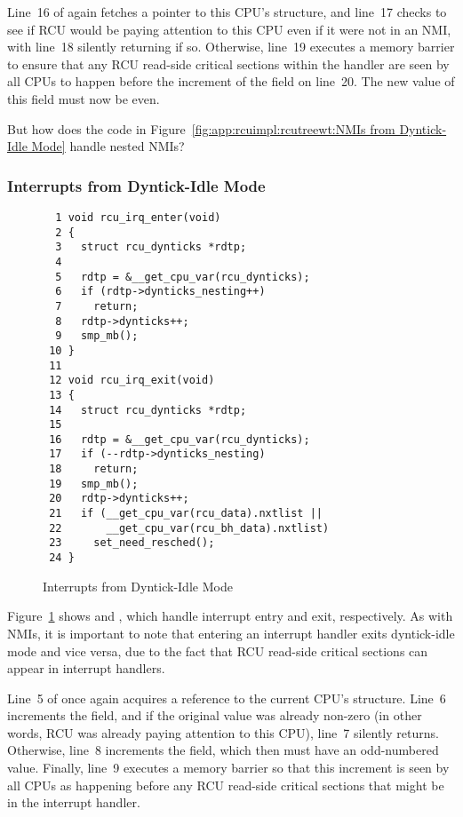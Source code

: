 Line~16 of  again fetches a pointer to this CPU's
 structure, and line~17 checks to see if RCU would
be paying attention to this CPU even if it were not in an NMI,
with line~18 silently returning if so.
Otherwise, line~19 executes a memory barrier to ensure that any
RCU read-side critical sections within the handler are seen by all
CPUs to happen before the increment of the  field
on line~20.
The new value of this field must now be even.

\QuickQuiz{}
	But how does the code in
	Figure~\ref{fig:app:rcuimpl:rcutreewt:NMIs from Dyntick-Idle Mode}
	handle nested NMIs?
 \QuickQuizEnd

\subsubsection{Interrupts from Dyntick-Idle Mode}
\label{app:rcuimpl:rcutreewt:Interrupts from Dyntick-Idle Mode}

\begin{figure}[tbp]
{ \scriptsize
\begin{verbatim}
  1 void rcu_irq_enter(void)
  2 {
  3   struct rcu_dynticks *rdtp;
  4
  5   rdtp = &__get_cpu_var(rcu_dynticks);
  6   if (rdtp->dynticks_nesting++)
  7     return;
  8   rdtp->dynticks++;
  9   smp_mb();
 10 }
 11
 12 void rcu_irq_exit(void)
 13 {
 14   struct rcu_dynticks *rdtp;
 15
 16   rdtp = &__get_cpu_var(rcu_dynticks);
 17   if (--rdtp->dynticks_nesting)
 18     return;
 19   smp_mb();
 20   rdtp->dynticks++;
 21   if (__get_cpu_var(rcu_data).nxtlist ||
 22       __get_cpu_var(rcu_bh_data).nxtlist)
 23     set_need_resched();
 24 }
\end{verbatim}
}
\caption{Interrupts from Dyntick-Idle Mode}
\label{fig:app:rcuimpl:rcutreewt:Interrupts from Dyntick-Idle Mode}
\end{figure}

Figure~\ref{fig:app:rcuimpl:rcutreewt:Interrupts from Dyntick-Idle Mode}
shows  and , which handle
interrupt entry and exit, respectively.
As with NMIs, it is important to note that entering an interrupt
handler exits dyntick-idle mode and vice versa, due to the fact
that RCU read-side critical sections can appear in interrupt handlers.

Line~5 of  once again acquires a reference to
the current CPU's  structure.
Line~6 increments the  field, and if the
original value was already non-zero (in other words, RCU was
already paying attention to this CPU), line~7 silently returns.
Otherwise, line~8 increments the   field, which
then must have an odd-numbered value.
Finally, line~9 executes a memory barrier so that this increment
is seen by all CPUs as happening before any RCU read-side critical
sections that might be in the interrupt handler.

